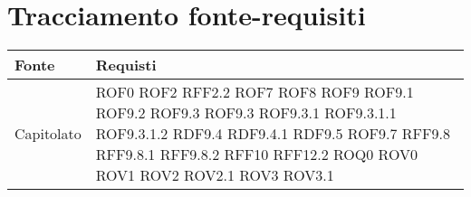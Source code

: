 \documentclass[../AnalisideiRequisiti.tex]{subfiles}
\begin{document}
	\section{Tracciamento fonte-requisiti}
	\begin{longtable}{| p{4cm} | p{4cm} |}
		\hline
		\textbf{Fonte} & \textbf{Requisti} \\
			\hline
		\endhead
		\newline Capitolato & \newline ROF0 \newline ROF2 \newline RFF2.2 \newline ROF7 \newline ROF8 \newline ROF9 \newline ROF9.1 \newline ROF9.2 \newline ROF9.3 \newline ROF9.3 \newline ROF9.3.1 \newline ROF9.3.1.1 \newline ROF9.3.1.2 \newline RDF9.4 \newline RDF9.4.1 \newline RDF9.5 \newline ROF9.7 \newline RFF9.8 \newline RFF9.8.1 \newline RFF9.8.2 \newline RFF10 \newline RFF12.2 \newline ROQ0 \newline ROV0 \newline ROV1 \newline ROV2 \newline ROV2.1 \newline ROV3 \newline ROV3.1 \\[1em]
	\hline	

\end{longtable}
\end{document}
